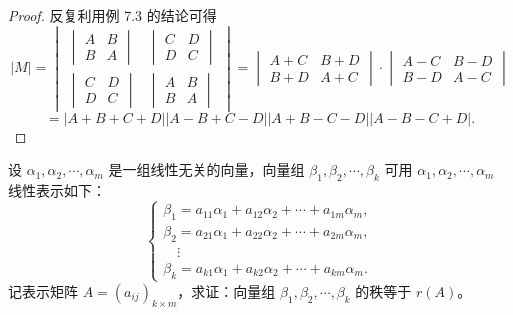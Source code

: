 \documentclass[lang=cn,12pt]{elegantbook}
\begin{document}
    \begin{proof}
    反复利用例 7.3 的结论可得
    \[
    |M| = 
    \begin{vmatrix}
    \begin{vmatrix}
    A & B \\
    B & A
    \end{vmatrix} & 
    \begin{vmatrix}
    C & D \\
    D & C
    \end{vmatrix} \\
    \begin{vmatrix}
    C & D \\
    D & C
    \end{vmatrix} & 
    \begin{vmatrix}
    A & B \\
    B & A
    \end{vmatrix}
    \end{vmatrix}
    = 
    \begin{vmatrix}
    A + C & B + D \\
    B + D & A + C
    \end{vmatrix}
    \cdot
    \begin{vmatrix}
    A - C & B - D \\
    B - D & A - C
    \end{vmatrix}
    \]
    \[
    = |A + B + C + D||A - B + C - D||A + B - C - D||A - B - C + D|.
    \]
    \end{proof}

    \begin{example}
        设 \(\alpha_1, \alpha_2, \cdots, \alpha_m\) 是一组线性无关的向量，向量组 \(\beta_1, \beta_2, \cdots, \beta_k\) 可用 \(\alpha_1, \alpha_2, \cdots, \alpha_m\) 线性表示如下：
        \[
        \begin{cases}
        \beta_1 = a_{11}\alpha_1 + a_{12}\alpha_2 + \cdots + a_{1m}\alpha_m, \\
        \beta_2 = a_{21}\alpha_1 + a_{22}\alpha_2 + \cdots + a_{2m}\alpha_m, \\
        \quad \vdots \\
        \beta_k = a_{k1}\alpha_1 + a_{k2}\alpha_2 + \cdots + a_{km}\alpha_m.
        \end{cases}
        \]
        记表示矩阵 \(A = (a_{ij})_{k \times m}\)，求证：向量组 \(\beta_1, \beta_2, \cdots, \beta_k\) 的秩等于 \(r(A)\)。
\end{example}
        
\end{document}
